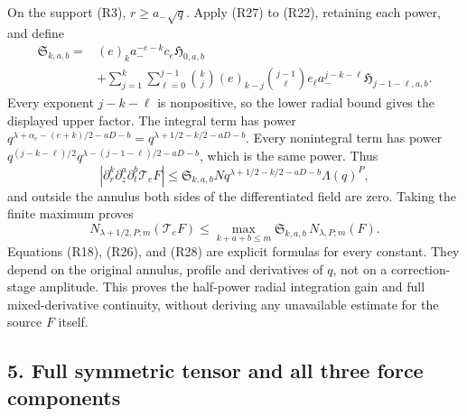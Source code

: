 \documentclass[10pt,a4paper]{article}
\begin{document}
On the support (R3), \(r\ge a_-\sqrt q\). Apply (R27) to (R22), retaining each power, and define \[
\begin{aligned}
\mathfrak S_{k,a,b}={}&(e)_k a_-^{-e-k}c_e\mathfrak H_{0,a,b}\\
&+\sum_{j=1}^k\sum_{\ell=0}^{j-1}
\binom kj(e)_{k-j}\binom{j-1}\ell e_{\underline\ell}
a_-^{j-k-\ell}\mathfrak H_{j-1-\ell,a,b}.
\end{aligned}
\tag{R28}
\] Every exponent \(j-k-\ell\) is nonpositive, so the lower radial bound gives the displayed upper factor. The integral term has power \(q^{\lambda+\alpha_e-(e+k)/2-aD-b}=q^{\lambda+1/2-k/2-aD-b}\). Every nonintegral term has power \(q^{(j-k-\ell)/2}q^{\lambda-(j-1-\ell)/2-aD-b}\), which is the same power. Thus \[
|\partial_r^k\partial_z^a\partial_t^b\mathcal T_eF|
\le\mathfrak S_{k,a,b}N q^{\lambda+1/2-k/2-aD-b}\Lambda(q)^P,
\tag{R29}
\] and outside the annulus both sides of the differentiated field are zero. Taking the finite maximum proves \[
N_{\lambda+1/2,P;m}(\mathcal T_eF)
\le\max_{k+a+b\le m}\mathfrak S_{k,a,b}\,N_{\lambda,P;m}(F).
\tag{R30}
\] Equations (R18), (R26), and (R28) are explicit formulas for every constant. They depend on the original annulus, profile and derivatives of \(q\), not on a correction-stage amplitude. This proves the half-power radial integration gain and full mixed-derivative continuity, without deriving any unavailable estimate for the source \(F\) itself.

\subsection{5. Full symmetric tensor and all three force components}\label{nsupstream:radial_stress_reconstruction_audit:full-symmetric-tensor-and-all-three-force-components}
\end{document}
